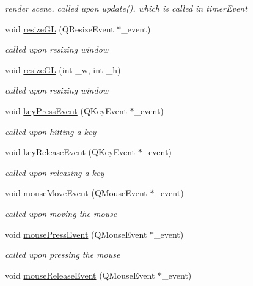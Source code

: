 \begin{DoxyCompactItemize}
\begin{DoxyCompactList}\small\item\em render scene, called upon update(), which is called in timer\-Event \end{DoxyCompactList}\item 
void \hyperlink{class_n_g_l_scene_a39f61e86b1e5a6c8125e3a762ea3f7f7}{resize\-G\-L} (Q\-Resize\-Event $\ast$\-\_\-event)
\begin{DoxyCompactList}\small\item\em called upon resizing window \end{DoxyCompactList}\item 
void \hyperlink{class_n_g_l_scene_a7505fac688fe82b4f99e601043eb7764}{resize\-G\-L} (int \-\_\-w, int \-\_\-h)
\begin{DoxyCompactList}\small\item\em called upon resizing window \end{DoxyCompactList}\item 
void \hyperlink{class_n_g_l_scene_a7a03bd8f485d27c4de72d24139ed8f8a}{key\-Press\-Event} (Q\-Key\-Event $\ast$\-\_\-event)
\begin{DoxyCompactList}\small\item\em called upon hitting a key \end{DoxyCompactList}\item 
void \hyperlink{class_n_g_l_scene_abfb1a790affff40de7183fa4016d1d2b}{key\-Release\-Event} (Q\-Key\-Event $\ast$\-\_\-event)
\begin{DoxyCompactList}\small\item\em called upon releasing a key \end{DoxyCompactList}\item 
void \hyperlink{class_n_g_l_scene_aa9822d94cb9c93a666fef86d86d2cf6c}{mouse\-Move\-Event} (Q\-Mouse\-Event $\ast$\-\_\-event)
\begin{DoxyCompactList}\small\item\em called upon moving the mouse \end{DoxyCompactList}\item 
void \hyperlink{class_n_g_l_scene_a8ead414be695622f8ace373628a25727}{mouse\-Press\-Event} (Q\-Mouse\-Event $\ast$\-\_\-event)
\begin{DoxyCompactList}\small\item\em called upon pressing the mouse \end{DoxyCompactList}\item 
void \hyperlink{class_n_g_l_scene_a6f363e63153342d91bafd3bdaf271c20}{mouse\-Release\-Event} (Q\-Mouse\-Event $\ast$\-\_\-event)

\end{DoxyCompactItemize}
